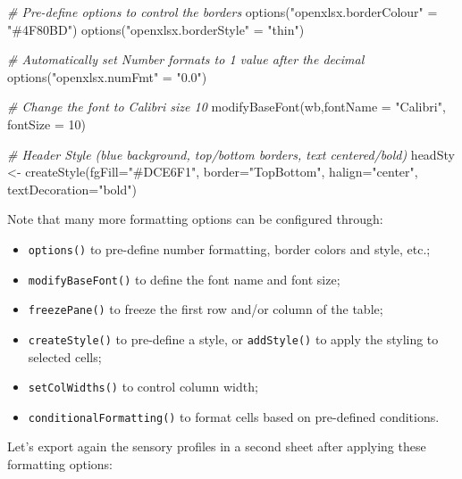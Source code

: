\documentclass[
]{krantz}
\makeatletter
\newenvironment{Shaded}{\begin{snugshade}}{\end{snugshade}}
\newcommand{\AttributeTok}[1]{\textcolor[rgb]{0.61,0.61,0.61}{#1}}
\newcommand{\CommentTok}[1]{\textcolor[rgb]{0.37,0.37,0.37}{\textit{#1}}}
\newcommand{\DecValTok}[1]{\textcolor[rgb]{0.06,0.06,0.06}{#1}}
\newcommand{\FunctionTok}[1]{\textcolor[rgb]{0,0,0}{#1}}
\newcommand{\NormalTok}[1]{#1}
\newcommand{\OtherTok}[1]{\textcolor[rgb]{0.37,0.37,0.37}{#1}}
\newcommand{\StringTok}[1]{\textcolor[rgb]{0.5,0.5,0.5}{#1}}
\providecommand{\tightlist}{%
  \setlength{\itemsep}{0pt}\setlength{\parskip}{0pt}}
\newenvironment{kframe}{%
\medskip{}
\setlength{\fboxsep}{.8em}
 \def\at@end@of@kframe{}%
 \ifinner\ifhmode%
  \def\at@end@of@kframe{\end{minipage}}%
  \begin{minipage}{\columnwidth}%
 \fi\fi%
 \def\FrameCommand##1{\hskip\@totalleftmargin \hskip-\fboxsep
 \colorbox{shadecolor}{##1}\hskip-\fboxsep
     \hskip-\linewidth \hskip-\@totalleftmargin \hskip\columnwidth}%
 \MakeFramed {\advance\hsize-\width
   \@totalleftmargin\z@ \linewidth\hsize
   \@setminipage}}%
 {\par\unskip\endMakeFramed%
 \at@end@of@kframe}
\renewenvironment{Shaded}{\begin{kframe}}{\end{kframe}}
\makeatother
\begin{document}
\begin{Shaded}
\begin{Highlighting}[]
\CommentTok{\# Pre{-}define options to control the borders }
\FunctionTok{options}\NormalTok{(}\StringTok{"openxlsx.borderColour"} \OtherTok{=} \StringTok{"\#4F80BD"}\NormalTok{)}
\FunctionTok{options}\NormalTok{(}\StringTok{"openxlsx.borderStyle"} \OtherTok{=} \StringTok{"thin"}\NormalTok{)}

\CommentTok{\# Automatically set Number formats to 1 value after the decimal}
\FunctionTok{options}\NormalTok{(}\StringTok{"openxlsx.numFmt"} \OtherTok{=} \StringTok{"0.0"}\NormalTok{)}

\CommentTok{\# Change the font to Calibri size 10}
\FunctionTok{modifyBaseFont}\NormalTok{(wb,}\AttributeTok{fontName =} \StringTok{"Calibri"}\NormalTok{, }\AttributeTok{fontSize =} \DecValTok{10}\NormalTok{)}

\CommentTok{\# Header Style (blue background, top/bottom borders, text centered/bold)}
\NormalTok{headSty }\OtherTok{\textless{}{-}} \FunctionTok{createStyle}\NormalTok{(}\AttributeTok{fgFill=}\StringTok{"\#DCE6F1"}\NormalTok{, }\AttributeTok{border=}\StringTok{"TopBottom"}\NormalTok{, }
                       \AttributeTok{halign=}\StringTok{"center"}\NormalTok{, }\AttributeTok{textDecoration=}\StringTok{"bold"}\NormalTok{)}
\end{Highlighting}
\end{Shaded}

Note that many more formatting options can be configured through:

\begin{itemize}
\tightlist
\item
  \texttt{options()} to pre-define number formatting, border colors and style, etc.;
\item
  \texttt{modifyBaseFont()} to define the font name and font size;
\item
  \texttt{freezePane()} to freeze the first row and/or column of the table;
\item
  \texttt{createStyle()} to pre-define a style, or \texttt{addStyle()} to apply the styling to selected cells;
\item
  \texttt{setColWidths()} to control column width;
\item
  \texttt{conditionalFormatting()} to format cells based on pre-defined conditions.
\end{itemize}

Let's export again the sensory profiles in a second sheet after applying these formatting options:
\end{document}
